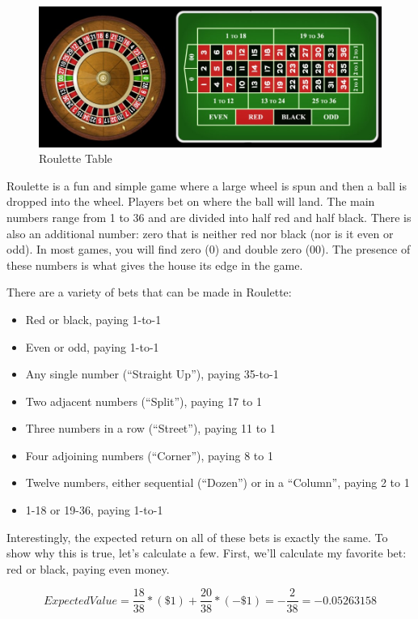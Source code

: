 \documentclass[
]{book}
\providecommand{\tightlist}{%
  \setlength{\itemsep}{0pt}\setlength{\parskip}{0pt}}
\begin{document}
\begin{figure}
\centering
\includegraphics{images/roulette.jpg}
\caption{Roulette Table}
\end{figure}

Roulette is a fun and simple game where a large wheel is spun and then a ball is dropped into the wheel. Players bet on where the ball will land. The main numbers range from 1 to 36 and are divided into half red and half black. There is also an additional number: zero that is neither red nor black (nor is it even or odd). In most games, you will find zero (0) and double zero (00). The presence of these numbers is what gives the house its edge in the game.

There are a variety of bets that can be made in Roulette:

\begin{itemize}
\tightlist
\item
  Red or black, paying 1-to-1
\item
  Even or odd, paying 1-to-1
\item
  Any single number (``Straight Up''), paying 35-to-1
\item
  Two adjacent numbers (``Split''), paying 17 to 1
\item
  Three numbers in a row (``Street''), paying 11 to 1
\item
  Four adjoining numbers (``Corner''), paying 8 to 1
\item
  Twelve numbers, either sequential (``Dozen'') or in a ``Column'', paying 2 to 1
\item
  1-18 or 19-36, paying 1-to-1
\end{itemize}

Interestingly, the expected return on all of these bets is exactly the same. To show why this is true, let's calculate a few. First, we'll calculate my favorite bet: red or black, paying even money.

\[ Expected Value = \frac{18}{38} * (\$1) + \frac{20}{38} * (-\$1) = -\frac{2}{38} = -0.05263158 \]
\end{document}
